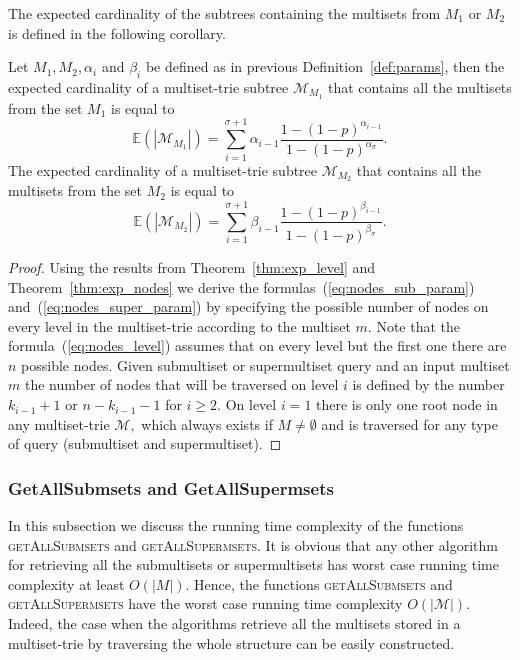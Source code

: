 The expected cardinality of the subtrees containing the multisets from $M_1$ or $M_2$ 
is defined in the following corollary.

\begin{corollary}\label{cor:exp_nodes_param}
Let $M_1, M_2, \alpha_i$ and $\beta_i$ be defined as in previous Definition~\ref{def:params}, 
then the expected cardinality of a multiset-trie subtree $\mathcal{M}_{M_1}$ that contains all the multisets 
from the set $M_1$ is equal to 
\begin{equation}\label{eq:nodes_sub_param}
\mathbb{E}( |\mathcal{M}_{M_1}| ) = \sum_{i=1}^{\sigma + 1} \alpha_{i-1} \frac{1-(1-p)^{\alpha_{i-1}}}{1-(1-p)^{\alpha_{\sigma}}}.
\end{equation}
The expected cardinality of a multiset-trie subtree $\mathcal{M}_{M_2}$ that contains all the multisets 
from the set $M_2$ is equal to 
\begin{equation}\label{eq:nodes_super_param}
\mathbb{E}( |\mathcal{M}_{M_2}| ) = \sum_{i=1}^{\sigma + 1} \beta_{i-1} \frac{1-(1-p)^{\beta_{i-1}}}{1-(1-p)^{\beta_{\sigma}}}.
\end{equation}
\end{corollary}
%
\begin{proof}
Using the results from Theorem~\ref{thm:exp_level} and Theorem~\ref{thm:exp_nodes} 
we derive the formulas~(\ref{eq:nodes_sub_param}) and~(\ref{eq:nodes_super_param}) 
by specifying the possible number of nodes on every level in the multiset-trie according 
to the multiset $m.$ Note that the formula~(\ref{eq:nodes_level}) assumes that on every 
level but the first one there are $n$ possible nodes. Given submultiset or supermultiset 
query and an input multiset $m$ the number of nodes that will be traversed on level $i$ is 
defined by the number $k_{i-1}+1$ or $n-k_{i-1}-1$ for $i\geq 2.$ On level $i=1$ 
there is only one root node in any multiset-trie $\mathcal{M},$ which always exists 
if $M\neq\emptyset$ and is traversed for any type of query (submultiset and 
supermultiset).
\end{proof}

\subsubsection{GetAllSubmsets and GetAllSupermsets}\label{ss:getall}
In this subsection we discuss the running time complexity of the functions 
\textsc{getAllSubmsets} and \textsc{getAllSupermsets}. It is obvious that any 
other algorithm for retrieving all the submultisets or supermultisets has worst 
case running time complexity at least $O(|M|).$ Hence, the functions 
\textsc{getAllSubmsets} and \textsc{getAllSupermsets} have the worst case 
running time complexity $O(|\mathcal{M}|).$ Indeed, the case when the algorithms 
retrieve all the multisets stored in a multiset-trie by traversing the whole structure 
can be easily constructed. 


